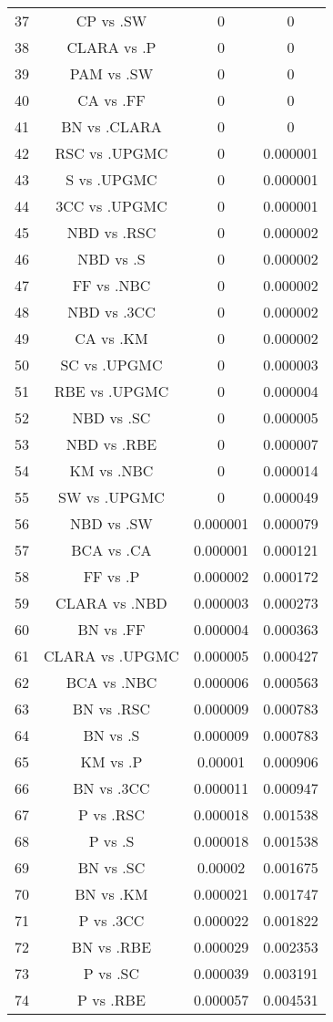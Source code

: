 \documentclass[a4paper,10pt]{article}
\begin{document}
\begin{landscape}
\begin{table}[!htp]
\begin{tabular}{cccc}
37&CP vs .SW&0&0\\
38&CLARA vs .P&0&0\\
39&PAM vs .SW&0&0\\
40&CA vs .FF&0&0\\
41&BN vs .CLARA&0&0\\
42&RSC vs .UPGMC&0&0.000001\\
43&S vs .UPGMC&0&0.000001\\
44&3CC vs .UPGMC&0&0.000001\\
45&NBD vs .RSC&0&0.000002\\
46&NBD vs .S&0&0.000002\\
47&FF vs .NBC&0&0.000002\\
48&NBD vs .3CC&0&0.000002\\
49&CA vs .KM&0&0.000002\\
50&SC vs .UPGMC&0&0.000003\\
51&RBE vs .UPGMC&0&0.000004\\
52&NBD vs .SC&0&0.000005\\
53&NBD vs .RBE&0&0.000007\\
54&KM vs .NBC&0&0.000014\\
55&SW vs .UPGMC&0&0.000049\\
56&NBD vs .SW&0.000001&0.000079\\
57&BCA vs .CA&0.000001&0.000121\\
58&FF vs .P&0.000002&0.000172\\
59&CLARA vs .NBD&0.000003&0.000273\\
60&BN vs .FF&0.000004&0.000363\\
61&CLARA vs .UPGMC&0.000005&0.000427\\
62&BCA vs .NBC&0.000006&0.000563\\
63&BN vs .RSC&0.000009&0.000783\\
64&BN vs .S&0.000009&0.000783\\
65&KM vs .P&0.00001&0.000906\\
66&BN vs .3CC&0.000011&0.000947\\
67&P vs .RSC&0.000018&0.001538\\
68&P vs .S&0.000018&0.001538\\
69&BN vs .SC&0.00002&0.001675\\
70&BN vs .KM&0.000021&0.001747\\
71&P vs .3CC&0.000022&0.001822\\
72&BN vs .RBE&0.000029&0.002353\\
73&P vs .SC&0.000039&0.003191\\
74&P vs .RBE&0.000057&0.004531\\

\end{tabular}
\end{table}
\end{landscape}
\end{document}

